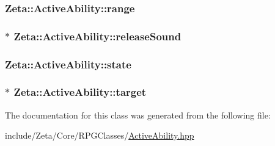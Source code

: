 \hypertarget{classZeta_1_1ActiveAbility_a556c513b5f222362222237baa86ef99b}{
\subsubsection[{range}]{ Zeta\+::\+Active\+Ability\+::range\hspace{0.3cm}{\ttfamily [protected]}}}\label{classZeta_1_1ActiveAbility_a556c513b5f222362222237baa86ef99b}
\hypertarget{classZeta_1_1ActiveAbility_a6d77d8fa73fb84a4424ed4e0e2424dcd}{
\subsubsection[{release\+Sound}]{$\ast$ Zeta\+::\+Active\+Ability\+::release\+Sound\hspace{0.3cm}{\ttfamily [protected]}}}\label{classZeta_1_1ActiveAbility_a6d77d8fa73fb84a4424ed4e0e2424dcd}
\hypertarget{classZeta_1_1ActiveAbility_a7eafb2407ae9edc5722576c6e2fe1195}{
\subsubsection[{state}]{ Zeta\+::\+Active\+Ability\+::state\hspace{0.3cm}{\ttfamily [protected]}}}\label{classZeta_1_1ActiveAbility_a7eafb2407ae9edc5722576c6e2fe1195}
\hypertarget{classZeta_1_1ActiveAbility_a8fa764979494dc8c1a482d61fd701f0a}{
\subsubsection[{target}]{$\ast$ Zeta\+::\+Active\+Ability\+::target\hspace{0.3cm}{\ttfamily [protected]}}}\label{classZeta_1_1ActiveAbility_a8fa764979494dc8c1a482d61fd701f0a}


The documentation for this class was generated from the following file\+:\begin{DoxyCompactItemize}
\item 
include/\+Zeta/\+Core/\+R\+P\+G\+Classes/\hyperlink{ActiveAbility_8hpp}{Active\+Ability.\+hpp}\end{DoxyCompactItemize}
